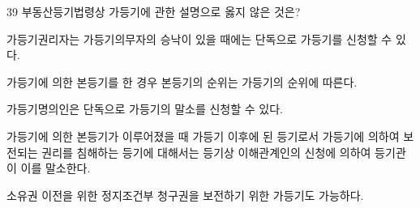 \begin{question}{39}
부동산등기법령상 가등기에 관한 설명으로 옳지 않은 것은?
\begin{choices}
  \item 가등기권리자는 가등기의무자의 승낙이 있을 때에는 단독으로 가등기를 신청할 수 있다.
  \item 가등기에 의한 본등기를 한 경우 본등기의 순위는 가등기의 순위에 따른다.
  \item 가등기명의인은 단독으로 가등기의 말소를 신청할 수 있다.
  \item 가등기에 의한 본등기가 이루어졌을 때 가등기 이후에 된 등기로서 가등기에 의하여 보전되는 권리를 침해하는 등기에 대해서는 등기상 이해관계인의 신청에 의하여 등기관이 이를 말소한다.
  \item 소유권 이전을 위한 정지조건부 청구권을 보전하기 위한 가등기도 가능하다.
\end{choices}
\end{question}
